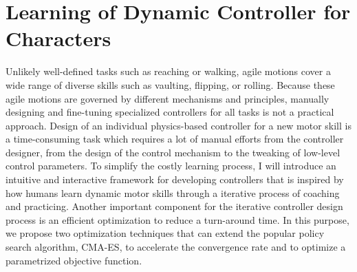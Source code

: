 \section{Learning of Dynamic Controller for Characters}
Unlikely well-defined tasks such as reaching or walking,
agile motions cover a wide range of diverse skills such as vaulting, flipping,
or rolling.
Because these agile motions are governed by different mechanisms and
principles, manually designing and fine-tuning specialized controllers for all
tasks is not a practical approach.
Design of an individual physics-based controller for a new motor skill is 
a time-consuming task  which requires a lot of manual efforts from the controller
designer, from the design of the control mechanism to the tweaking of low-level
control parameters. 
To simplify the costly learning process, I will introduce an intuitive and 
interactive framework for developing controllers that is inspired by
how humans learn dynamic motor skills through a iterative process of coaching
and practicing.
Another important component for the iterative controller design process
is an efficient optimization to reduce a turn-around time.
In this purpose, we propose two optimization techniques that can extend the
popular policy search algorithm, CMA-ES, to accelerate the convergence rate
and to optimize a parametrized objective function.

